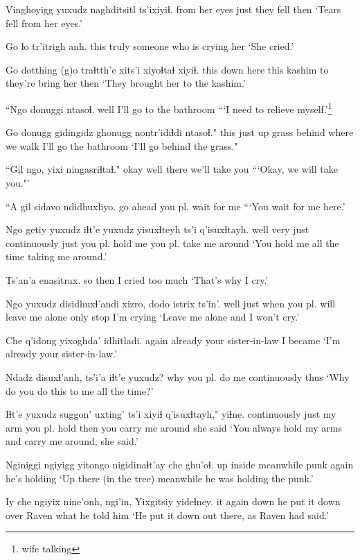 \documentclass[12pt]{article}
\begin{document}
\gll Vinghoyigg yuxudz naghditsitl ts'ixiyiɬ.
{from her eyes} just {they fell} then
\glt  `Tears fell from her eyes.'
\glend

\gll Go ɬo tr'itrigh anh.
this truly {someone who is crying} her
\glt `She cried.'
\glend

\gll Go dotthing (g)o traɬtth'e xits'i xiyoɬtaɬ xiyiɬ.
this {down here} this kashim to {they're bring her} then
\glt `They brought her to the kashim.'
\glend

\gll ``Ngo {donuggi ntasoɬ.}
well {I'll go to the bathroom}
\glt ```I need to relieve myself.'\footnote{wife talking}
\glend

\gll Go donugg gidingidz ghonugg nontr'idiɬdi ntasoɬ."
this {just up} grass behind {where we walk} {I'll go the bathroom}
\glt `I'll go behind the grass."
\glend
 
\gll ``Gil ngo, yixi ningasriɬtaɬ."
okay well there {we'll take you}
\glt ```Okay, we will take you."'
\glend

\gll ``A gil {sidavo ndidhuxliyo.}
{} {go ahead} {you pl. wait for me}
\glt ```You wait for me here.'
\glend

\gll Ngo getiy yuxudz iɬt'e yuxudz yisuxɬteyh ts'i q'isuxɬtayh.
well very just continuously just {you pl. hold me} {} {you pl. take me around}
\glt `You hold me all the time taking me around.'
\glend

\gll Ts'an'a enasitrax.
{so then} {I cried too much}
\glt `That's why I cry.'
\glend

\gll Ngo yuxudz disidhuxɬ'andi xizro, dodo istrix ts'in'.
well just {when you pl. will leave me alone} only stop {I'm crying} {}
\glt `Leave me alone and I won't cry.'
\glend

\gll Che q'idong yixoghda' idhitladi.
again already {your sister-in-law} {I became}
\glt `I'm already your sister-in-law.'
\glend

\gll Ndadz disuxɬ'anh, ts'i'a iɬt'e yuxudz?
why {you pl. do me} {} continuously thus
\glt `Why do you do this to me all the time?'
\glend

\gll Iɬt'e yuxudz suggon' uxting' ts'i xiyiɬ q'isuxɬtayh," yiɬne.
continuously just {my arm} {you pl. hold} {} then {you carry me around} {she said}
\glt `You always hold my arms and carry me around, she said.'
\glend

\gll Nginiggi ngiyigg yitongo nigidinaɬt'ay che ghu'oɬ.
up inside meanwhile punk again {he's holding}
\glt `Up there (in the tree) meanwhile he was holding the punk.'
\glend

\gll Iy che ngiyix nine'onh, ngi'in, Yixgitsiy yideɬney.
it again down {he put it down} over Raven {what he told him}
\glt `He put it down out there, as Raven had said.'
\glend
\end{document}
